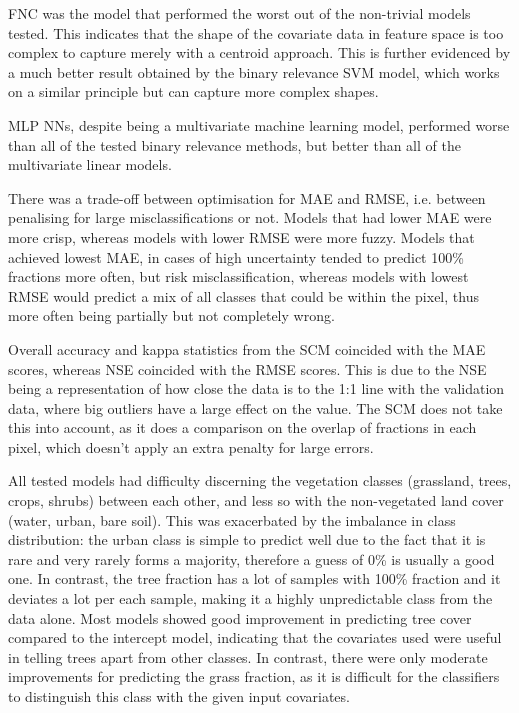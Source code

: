 \documentclass[a4paper,10pt]{article}
\begin{document}
\Gls{FNC} was the model that performed the worst out of the non-trivial models tested.
This indicates that the shape of the covariate data in feature space is too complex to capture merely with a centroid approach.
This is further evidenced by a much better result obtained by the binary relevance \gls{SVM} model, which works on a similar principle but can capture more complex shapes.

\Gls{MLP} \glspl{NN}, despite being a multivariate machine learning model, performed worse than all of the tested binary relevance methods, but better than all of the multivariate linear models.

There was a trade-off between optimisation for \gls{MAE} and \gls{RMSE}, i.e. between penalising for large misclassifications or not.
Models that had lower \gls{MAE} were more crisp, whereas models with lower \gls{RMSE} were more fuzzy.
Models that achieved lowest \gls{MAE}, in cases of high uncertainty tended to predict 100\% fractions more often, but risk misclassification, whereas models with lowest \gls{RMSE} would predict a mix of all classes that could be within the pixel, thus more often being partially but not completely wrong.

Overall accuracy and kappa statistics from the \gls{SCM} coincided with the \gls{MAE} scores, whereas \gls{NSE} coincided with the \gls{RMSE} scores.
This is due to the \gls{NSE} being a representation of how close the data is to the 1:1 line with the validation data, where big outliers have a large effect on the value.
The \gls{SCM} does not take this into account, as it does a comparison on the overlap of fractions in each pixel, which doesn't apply an extra penalty for large errors.

All tested models had difficulty discerning the vegetation classes (grassland, trees, crops, shrubs) between each other, and less so with the non-vegetated land cover (water, urban, bare soil).
This was exacerbated by the imbalance in class distribution: the urban class is simple to predict well due to the fact that it is rare and very rarely forms a majority, therefore a guess of 0\% is usually a good one.
In contrast, the tree fraction has a lot of samples with 100\% fraction and it deviates a lot per each sample, making it a highly unpredictable class from the data alone.
Most models showed good improvement in predicting tree cover compared to the intercept model, indicating that the covariates used were useful in telling trees apart from other classes.
In contrast, there were only moderate improvements for predicting the grass fraction, as it is difficult for the classifiers to distinguish this class with the given input covariates.
\end{document}
